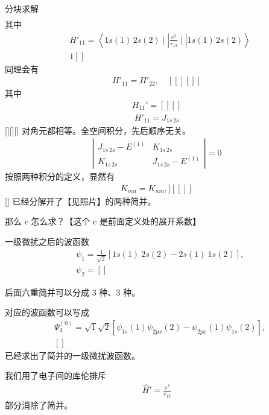 分块求解
\begin{align}
    [matrix]
\end{align}
其中
\begin{align}
    &H'_{11} = \left\langle 1s(1) \, 2s(2) \mid | \frac{e^2}{r_{12}} \mid | 1s(1) \, 2s(2) \right\rangle \\
    &1 []
\end{align}
同理会有
\begin{align}
    H'_{11} = H'_{22}, \quad [[][]]
\end{align}
其中
\begin{align}
    H_{11}' = [][]
\end{align}
\begin{align}
    H'_{11} = J_{1s \,2s}
\end{align}
[][][]
对角元都相等。全空间积分，先后顺序无关。
\begin{align}
    \left|\begin{matrix}
        J_{1s\,2s} - E^{(1)} & K_{1s\,2s} \\
        K_{1s\,2s} & J_{1s\, 2s} - E^{(1)}
    \end{matrix}\right| = 0
\end{align}
按照两种积分的定义，显然有
\begin{align}
    K_{mn} = K_{nm}, ][[]]
\end{align}
[]
已经分解开了【见照片】的两种简并。

那么 $c$ 怎么求？【这个 c 是前面定义处的展开系数】

一级微扰之后的波函数
\begin{align}
    &\psi_1 = \frac 1{\sqrt 2} [ 1s(1) \ 2s(2) - 2s(1) \ 1s(2) ], \\
    &\psi_2 = []
\end{align}

后面六重简并可以分成 3 种、3 种。

对应的波函数可以写成 %
\begin{align}
    & \Psi_3^{(0)} = \sqrt1{\sqrt 2} \left[
        \psi_{1s}(1) \psi_{2px}(2) - \psi_{2px}(1) \psi_{1s}(2) 
    \right], \\
    & []
\end{align}
已经求出了简并的一级微扰波函数。

我们用了电子间的库伦排斥
\begin{align}
    \hat H' = \frac{e^2}{r_{12}}
\end{align}
部分消除了简并。

